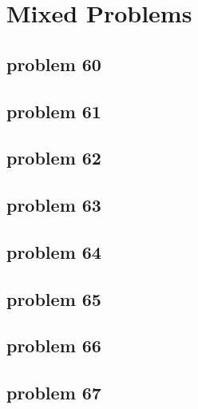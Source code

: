 \section{Mixed Problems}

\subsection{problem 60}


\subsection{problem 61}


\subsection{problem 62}


\subsection{problem 63}


\subsection{problem 64}


\subsection{problem 65}


\subsection{problem 66}


\subsection{problem 67}

